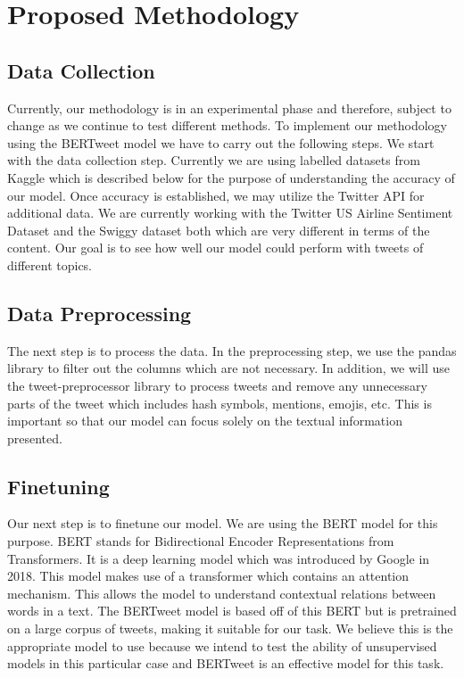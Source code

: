 \documentclass[conference]{IEEEtran}
\begin{document}
\section{Proposed Methodology}
\subsection{Data Collection}
Currently, our methodology is in an experimental phase and therefore, subject to change as we continue to test different methods. 
To implement our methodology using the BERTweet model we have to carry out the following steps. 
We start with the data collection step. 
Currently we are using labelled datasets from Kaggle which is described below for the purpose of understanding the accuracy of our model. 
Once accuracy is established, we may utilize the Twitter API for additional data. 
We are currently working with the Twitter US Airline Sentiment Dataset and the Swiggy dataset both which are very different in terms of the content. 
Our goal is to see how well our model could perform with tweets of different topics. 

\subsection{Data Preprocessing}
The next step is to process the data. 
In the preprocessing step, we use the pandas library to filter out the columns which are not necessary.  
In addition, we will use the tweet-preprocessor library to process tweets and remove any unnecessary parts of the tweet which includes hash symbols, mentions, emojis, etc. 
This is important so that our model can focus solely on the textual information presented. 

\subsection{Finetuning}
Our next step is to finetune our model. 
We are using the BERT model for this purpose. 
BERT stands for Bidirectional Encoder Representations from Transformers. 
It is a deep learning model which was introduced by Google in 2018. 
This model makes use of a transformer which contains an attention mechanism. 
This allows the model to understand contextual relations between words in a text. 
The BERTweet model is based off of this BERT but is pretrained on a large corpus of tweets, making it suitable for our task. 
We believe this is the appropriate model to use because we intend to test the ability of unsupervised models in this particular case and BERTweet is an effective model for this task.
\end{document}
